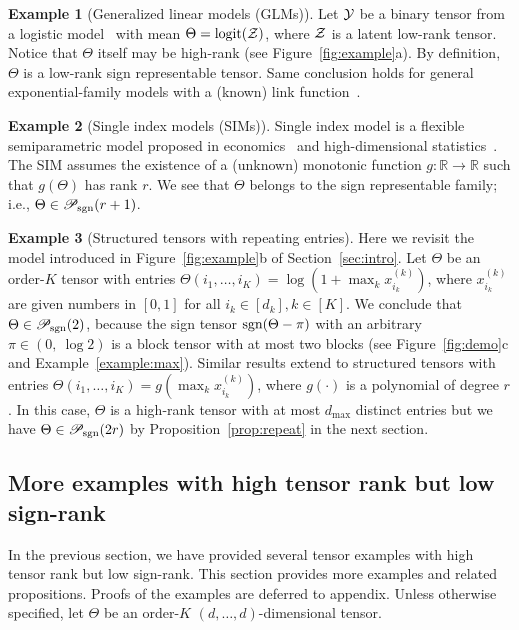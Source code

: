 \documentclass[twoside,11pt]{article}
\theoremstyle{plain}
\theoremstyle{definition}
\newtheorem{example}{Example}
\def\sign{\textup{sgn}}
\def\caliP{\mathscr{P}_{\textup{sgn}}}
\begin{document}
\begin{example}[Generalized linear models (GLMs)] Let $\mathcal{Y}$ be a binary tensor from a logistic model~\citep{wang2018learning} with mean $\Theta=\text{logit}(\mathcal{Z})$, where $\mathcal{Z}$ is a latent low-rank tensor. Notice that $\Theta$ itself may be high-rank (see Figure~\ref{fig:example}a). By definition, $\Theta$ is a low-rank sign representable tensor. Same conclusion holds for general exponential-family models with a (known) link function~\citep{hong2020generalized}. 
\end{example}

\begin{example}[Single index models (SIMs)] Single index model is a flexible semiparametric model proposed in economics~\citep{robinson1988root} and high-dimensional statistics~\citep{balabdaoui2019least,ganti2017learning}. The SIM assumes the existence of a (unknown) monotonic function $g\colon \mathbb{R}\to \mathbb{R}$ such that $g(\Theta)$ has rank $r$. We see that $\Theta$ belongs to the sign representable family; i.e., $\Theta\in \caliP(r+1)$. 
\end{example}

\begin{example}[Structured tensors with repeating entries]\label{eq:example} Here we revisit the model introduced in Figure~\ref{fig:example}b of Section~\ref{sec:intro}. Let $\Theta$ be an order-$K$ tensor with entries $\Theta(i_1,\ldots,i_K)=\log(1+\max_kx^{(k)}_{i_k})$, where $x^{(k)}_{i_k}$ are given numbers in $[0,1]$ for all $i_k\in[d_k], k\in[K]$. We conclude that $\Theta \in \caliP(2)$, because the sign tensor $\sign(\Theta-\pi)$ with an arbitrary $\pi\in(0,\ \log 2)$ is a block tensor with at most two blocks (see Figure~\ref{fig:demo}c and Example~\ref{example:max}). Similar results extend to structured tensors with entries $\Theta(i_1,\ldots,i_K)=g(\max_kx^{(k)}_{i_k})$, where $g(\cdot)$ is a polynomial of degree $r$. In this case, $\Theta$ is a high-rank tensor with at most $d_{\max}$ distinct entries but we have $\Theta\in \caliP(2r)$ by Proposition~\ref{prop:repeat} in the next section. 
\end{example}



\subsection{More examples with high tensor rank but low sign-rank}\label{sec:high-rank}
In the previous section, we have provided several tensor examples with high tensor rank but low sign-rank. This section provides more examples and related propositions.  Proofs of the examples are deferred to appendix.
Unless otherwise specified, let $\Theta$ be an order-$K$ $(d,\ldots,d)$-dimensional tensor. 
\end{document}
